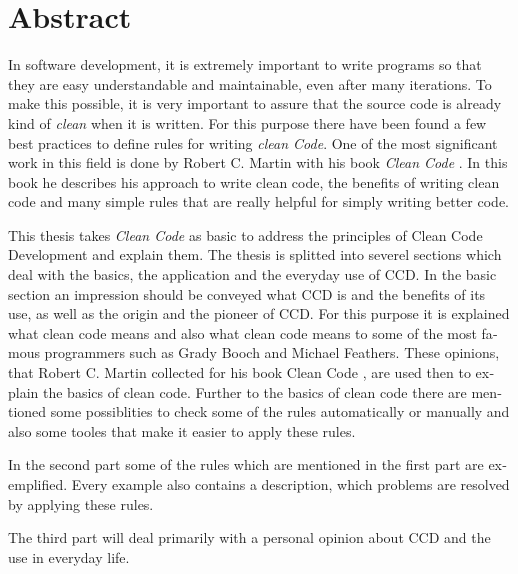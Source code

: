 \chapter{Abstract}

\begin{english} 
In software development, it is extremely important to write programs so that they are easy understandable and maintainable, even after many iterations. To make this possible, it is very important to assure that the source code is already kind of \textit{clean} when it is written. For this purpose there have been found a few best practices to define rules for writing \textit{clean Code}. One of the most significant work in this field is done by Robert C. Martin with his book \textit{Clean Code} \cite{Martin2008}. In this book he describes his approach to write clean code, the benefits of writing clean code and many simple rules that are really helpful for simply writing better code.

This thesis takes \textit{Clean Code} \cite{Martin2008} as basic to address the principles of Clean Code Development and explain them. The thesis is splitted into severel sections which deal with the basics, the application and the everyday use of CCD. In the basic section an impression should be conveyed what CCD is and the benefits of its use, as well as the origin and the pioneer of CCD. For this purpose it is explained what clean code means and also what clean code means to some of the most famous programmers such as Grady Booch and Michael Feathers. These opinions, that Robert C. Martin collected for his book Clean Code \cite{Martin2008}, are used then to explain the basics of clean code. Further to the basics of clean code there are mentioned some possiblities to check some of the rules automatically or manually and also some tooles that make it easier to apply these rules.

In the second part some of the rules which are mentioned in the first part are exemplified. Every example also contains a description, which problems are resolved by applying these rules.

The third part will deal primarily with a personal opinion about CCD and the use in everyday life.
\end{english}